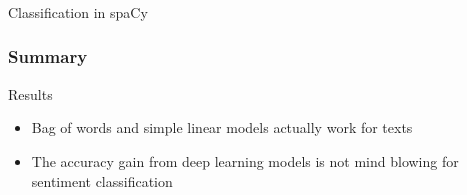 \begin{frame}[fragile]\frametitle{}

\begin{center}
{\Large Classification in spaCy}
\end{center}
\end{frame}

\begin{frame}[fragile]\frametitle{Summary}
Results

\begin{itemize}
\item Bag of words and simple linear models actually work for 
texts
\item  The accuracy gain from deep learning models is not mind 
blowing for sentiment classification
  \end{itemize}

\end{frame}





